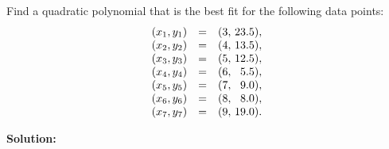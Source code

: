 \documentclass{ximera}
\begin{document}
\begin{example}\label{ex:least-squares-parabola}

  Find a quadratic polynomial that is the best fit for the following
  data points:
  \begin{equation*}
    \begin{array}{rcr@{~}r}
      (x_1,y_1) &=& ( 3,& 23.5), \\
      (x_2,y_2) &=& ( 4,& 13.5), \\
      (x_3,y_3) &=& ( 5,& 12.5), \\
      (x_4,y_4) &=& ( 6,&  5.5), \\
      (x_5,y_5) &=& ( 7,&  9.0), \\
      (x_6,y_6) &=& ( 8,&  8.0), \\
      (x_7,y_7) &=& ( 9,& 19.0). \\
    \end{array}
  \end{equation*}

  \textbf{Solution:}


\end{example}
\end{document}
